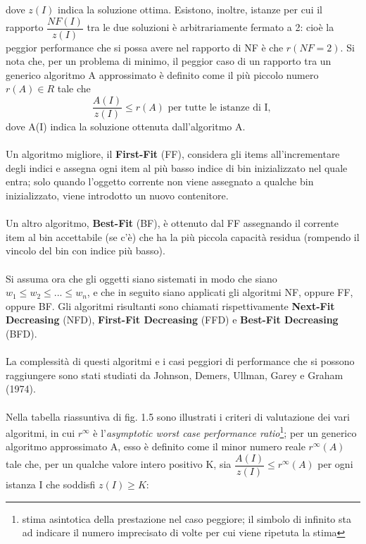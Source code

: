 \documentclass[12pt,a4paper,openright,twoside]{report}
\begin{document}
dove $z(I)$ indica la soluzione ottima. Esistono, inoltre, istanze per cui il rapporto $\dfrac{NF(I)}{z(I)}$ tra le due soluzioni \`{e} arbitrariamente fermato a 2: cio\`{e} la peggior performance che si possa avere nel rapporto di NF \`{e} che $r(NF = 2)$. Si nota che, per un problema di minimo, il peggior caso di un rapporto tra un generico algoritmo A approssimato \`{e} definito come il pi\`{u} piccolo numero $r(A) \in R$ tale che $$\dfrac{A(I)}{z(I)} \leq r(A) \mbox{ per tutte le istanze di I, }$$ dove A(I) indica la soluzione ottenuta dall'algoritmo A.\\
\\Un algoritmo migliore, il \textbf{First-Fit} (FF), considera gli items all'incrementare degli indici e assegna ogni item al pi\`{u} basso indice di bin inizializzato nel quale entra; solo quando l'oggetto corrente non viene assegnato a qualche bin inizializzato, viene introdotto un nuovo contenitore.\\
\\Un altro algoritmo, \textbf{Best-Fit} (BF), \`{e} ottenuto dal FF assegnando il corrente item al bin accettabile (se c'\`{e}) che ha la pi\`{u} piccola capacit\`{a} residua (rompendo il vincolo del bin con indice pi\`{u} basso).\\
\\Si assuma ora che gli oggetti siano sistemati in modo che siano $w_{1} \leq w_{2} \leq ... \leq w_{n}$, e che in seguito siano applicati gli algoritmi NF, oppure FF, oppure BF. Gli algoritmi risultanti sono chiamati rispettivamente \textbf{Next-Fit Decreasing} (NFD), \textbf{First-Fit Decreasing} (FFD) e \textbf{Best-Fit Decreasing} (BFD).\\
\\La complessit\`{a} di questi algoritmi e i casi peggiori di performance che si possono raggiungere sono stati studiati da Johnson, Demers, Ullman, Garey e Graham (1974).\\
\\Nella tabella riassuntiva di fig. 1.5 sono illustrati i criteri di valutazione dei vari algoritmi, in cui $r^{\infty}$ \`{e} l'\textit{asymptotic worst case performance ratio}\footnote{stima asintotica della prestazione nel caso peggiore; il simbolo di infinito sta ad indicare il numero imprecisato di volte per cui viene ripetuta la stima}; per un generico algoritmo approssimato A, esso \`{e} definito come il minor numero reale $r^{\infty}(A)$ tale che, per un qualche valore intero positivo K, sia $\dfrac{A(I)}{z(I)} \leq r^{\infty}(A)$ per ogni istanza I che soddisfi $z(I) \geq K$:  \\
\end{document}

